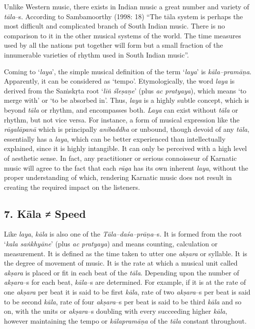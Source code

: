 Unlike Western music, there exists in Indian music a great number and variety of \textit{tāla}–s. According to Sambamoorthy (1998: 18) “The tāla system is perhaps the most difficult and complicated branch of South Indian music. There is no comparison to it in the other musical systems of the world. The time measures used by all the nations put together will form but a small fraction of the innumerable varieties of rhythm used in South Indian music”.

Coming to ‘\textit{laya}’, the simple musical definition of the term ‘\textit{laya}’ is \textit{kāla–pramāṇa}. Apparently, it can be considered as ‘tempo’. Etymologically, the word \textit{laya} is derived from the Saṁskṛta root ‘\textit{līṅ śleṣaṇe}’ (plus \textit{ac pratyaya}), which means ‘to merge with’ or ‘to be absorbed in’. Thus, \textit{laya} is a highly subtle concept, which is beyond \textit{tāla} or rhythm, and encompasses both. \textit{Laya} can exist without \textit{tāla} or rhythm, but not vice versa. For instance, a form of musical expression like the \textit{rāgalāpanā} which is principally \textit{anibaddha} or unbound, though devoid of any \textit{tāla}, essentially has a \textit{laya}, which can be better experienced than intellectually explained, since it is highly intangible. It can only be perceived with a high level of aesthetic sense. In fact, any practitioner or serious connoisseur of Karnatic music will agree to the fact that each \textit{rāga} has its own inherent \textit{laya}, without the proper understanding of which, rendering Karnatic music does not result in creating the required impact on the listeners.


\subsection*{7. Kāla ≠ Speed}

Like \textit{laya}, \textit{kāla} is also one of the \textit{Tāla–daśa–prāṇa}–s. It is formed from the root ‘\textit{kala saṅkhyāne}’ (plus \textit{ac pratyaya}) and means counting, calculation or measurement. It is defined as the time taken to utter one \textit{akṣara} or syllable. It is the degree of movement of music. It is the rate at which a musical unit called \textit{akṣara} is placed or fit in each beat of the \textit{tāla}. Depending upon the number of \textit{akṣara}–s for each beat, \textit{kāla}–s are determined. For example, if it is at the rate of one \textit{akṣara} per beat it is said to be first \textit{kāla}, rate of two \textit{akṣara}–s per beat is said to be second \textit{kāla}, rate of four \textit{akṣara}–s per beat is said to be third \textit{kāla} and so on, with the units or \textit{akṣara}–s doubling with every succeeding higher \textit{kāla}, however maintaining the tempo or \textit{kālapramāṇa} of the \textit{tāla} constant throughout.

